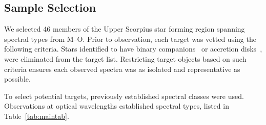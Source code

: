 \subsection{Sample Selection}\label{sec:sampsel}


We selected 46 members of the Upper Scorpius star forming region spanning spectral types from M--O.
Prior to observation, each target was vetted using the following criteria. 
Stars identified to have binary companions~\cite{binary_guy} or accretion 
disks~\cite{binary_guy}, were eliminated from the target list.  
Restricting target objects based on such criteria ensures each observed 
spectra was as isolated and representative as possible.



To select potential targets, previously established spectral classes 
were used.  
Observations at optical wavelengths established 
spectral types, listed in Table~\ref{tab:maintab}.  











